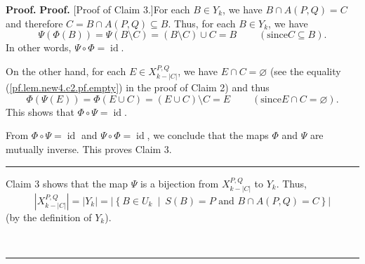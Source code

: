 \documentclass[numbers=enddot,12pt,final,onecolumn,notitlepage]{scrartcl}%
\theoremstyle{definition}
\newenvironment{proof}[1][Proof]{\noindent\textbf{#1.} }{\ \rule{0.5em}{0.5em}}
\theoremstyle{plainsl}
\begin{document}
\begin{proof}
\begin{proof}
[Proof of Claim 3.]For each $B\in Y_{k}$, we have $B\cap A\left(  P,Q\right)
=C$ and therefore $C=B\cap A\left(  P,Q\right)  \subseteq B$. Thus, for each
$B\in Y_{k}$, we have%
\[
\Psi\left(  \Phi\left(  B\right)  \right)  =\Psi\left(  B\setminus C\right)
=\left(  B\setminus C\right)  \cup C=B\ \ \ \ \ \ \ \ \ \ \left(  \text{since
}C\subseteq B\right)  .
\]
In other words, $\Psi\circ\Phi=\operatorname*{id}$.

On the other hand, for each $E\in X_{k-|C|}^{P,Q}$, we have $E\cap
C=\varnothing$ (see the equality (\ref{pf.lem.new4.c2.pf.empty}) in the proof
of Claim 2) and thus%
\[
\Phi\left(  \Psi\left(  E\right)  \right)  =\Phi\left(  E\cup C\right)
=\left(  E\cup C\right)  \setminus C=E\ \ \ \ \ \ \ \ \ \ \left(  \text{since
}E\cap C=\varnothing\right)  .
\]
This shows that $\Phi\circ\Psi=\operatorname*{id}$.

From $\Phi\circ\Psi=\operatorname*{id}$ and $\Psi\circ\Phi=\operatorname*{id}%
$, we conclude that the maps $\Phi$ and $\Psi$ are mutually inverse. This
proves Claim 3.
\end{proof}

Claim 3 shows that the map $\Psi$ is a bijection from $X_{k-|C|}^{P,Q}$ to
$Y_{k}$. Thus,%
\[
\left\vert X_{k-|C|}^{P,Q}\right\vert =\left\vert Y_{k}\right\vert =\left\vert
\left\{  B\in U_{k}\ \mid\ S\left(  B\right)  =P\text{ and }B\cap A\left(
P,Q\right)  =C\right\}  \right\vert
\]
(by the definition of $Y_{k}$).


\end{proof}
\end{document}
